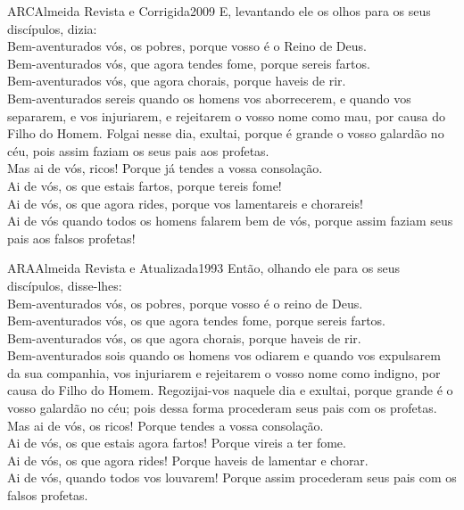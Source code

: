 \begin{traducao}{ARC}{Almeida Revista e Corrigida}{2009}
E, levantando ele os olhos para os seus discípulos, dizia:\\
Bem-aventurados vós, os pobres, porque vosso é o Reino de Deus.\\
Bem-aventurados vós, que agora tendes fome, porque sereis fartos.\\
Bem-aventurados vós, que agora chorais, porque haveis de rir.\\
Bem-aventurados sereis quando os homens vos aborrecerem, e quando vos
separarem, e vos injuriarem, e rejeitarem o vosso nome como mau, por causa do
Filho do Homem. Folgai nesse dia, exultai, porque é grande o vosso
galardão no céu, pois assim faziam os seus pais aos profetas.\\
Mas ai de vós, ricos! Porque já tendes a vossa consolação.\\
Ai de vós, os que estais fartos, porque tereis fome!\\
Ai de vós, os que agora rides, porque vos lamentareis e chorareis!\\
Ai de vós quando todos os homens falarem bem de vós, porque assim faziam
seus pais aos falsos profetas!
\end{traducao}

\begin{traducao}{ARA}{Almeida Revista e Atualizada}{1993}
Então, olhando ele para os seus discípulos, disse-lhes:\\
Bem-aventurados vós, os pobres, porque vosso é o reino de Deus.\\
Bem-aventurados vós, os que agora tendes fome, porque sereis fartos.\\
Bem-aventurados vós, os que agora chorais, porque haveis de rir.\\
Bem-aventurados sois quando os homens vos odiarem e quando vos
expulsarem da sua companhia, vos injuriarem e rejeitarem o vosso nome como
indigno, por causa do Filho do Homem. Regozijai-vos naquele dia e
exultai, porque grande é o vosso galardão no céu; pois dessa forma procederam
seus pais com os profetas.\\
Mas ai de vós, os ricos! Porque tendes a vossa consolação.\\
Ai de vós, os que estais agora fartos! Porque vireis a ter fome.\\
Ai de vós, os que agora rides! Porque haveis de lamentar e chorar.\\
Ai de vós, quando todos vos louvarem! Porque assim procederam seus pais
com os falsos profetas.
\end{traducao}

